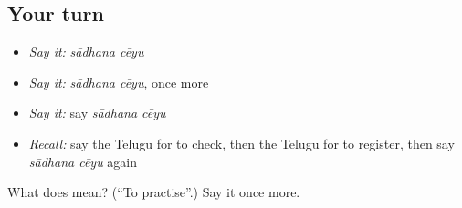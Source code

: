 \subsection*{Your turn}
\begin{itemize}
\raggedright
  \item \emph{Say it:} \emph{sādhana cēyu}
  \item \emph{Say it:} \emph{sādhana cēyu}, once more
  \item \emph{Say it:} say \emph{sādhana cēyu}
  \item \emph{Recall:} say the Telugu for to check, then the Telugu for to register, then say \emph{sādhana cēyu} again
\end{itemize}

\begin{tcolorbox}[breakable,colback=teal!4,colframe=teal!35!black,title={Before you move on}]
What does   mean? (\textquotedblleft{}To practise\textquotedblright{}.) Say it once more.
\end{tcolorbox}
